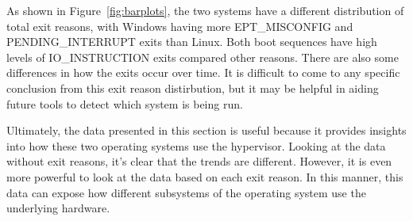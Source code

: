 \documentclass[notitlepage]{article}
\begin{document}
As shown in Figure~\ref{fig:barplots}, the two systems have a different
distribution of total exit reasons, with Windows having more EPT\_MISCONFIG and
PENDING\_INTERRUPT exits than Linux. Both boot sequences have high levels of
IO\_INSTRUCTION exits compared other reasons.  There are also some differences
in how the exits occur over time. It is difficult to come to any specific
conclusion from this exit reason distirbution, but it may be helpful in aiding
future tools to detect which system is being run.

Ultimately, the data presented in this section is useful because it provides
insights into how these two operating systems use the hypervisor. Looking
at the data without exit reasons, it's clear that the trends are different.
However, it is even more powerful to look at the data based on each exit reason.
In this manner, this data can expose how different subsystems of the operating
system use the underlying hardware.
\end{document}
